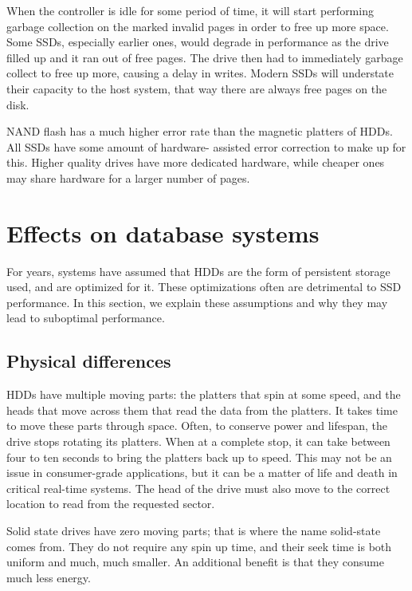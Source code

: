 \documentclass[format=acmsmall, review=false, screen=true]{acmart}
\begin{document}
When the controller is idle for some period of time, it will start performing garbage collection on the marked invalid 
pages in order to free up more space. Some SSDs, especially earlier ones, would degrade in performance as the drive filled 
up and it ran out of free pages. The drive then had to immediately garbage collect to free up more, causing a delay in writes. 
Modern SSDs will understate their capacity to the host system, that way there are always free pages on the disk. 
\cite{Dirik2009, Cornwell2012, Micheloni2013, MatejFucek2014, Chen2016}

NAND flash has a much higher error rate than the magnetic platters of HDDs. All SSDs have some amount of hardware-
assisted error correction to make up for this. Higher quality drives have more dedicated hardware, while cheaper ones 
may share hardware for a larger number of pages. \cite{Dirik2009, Cornwell2012, Micheloni2013, MatejFucek2014, Chen2016}

\section{Effects on database systems}

For years, systems have assumed that HDDs are the form of persistent storage used, and are optimized for it. These 
optimizations often are detrimental to SSD performance. In this section, we explain these assumptions and why they 
may lead to suboptimal performance.

\subsection{Physical differences}

HDDs have multiple moving parts: the platters that spin at some speed, and the heads that move across them that read the 
data from the platters. It takes time to move these parts through space. Often, to conserve power and lifespan, the drive 
stops rotating its platters. When at a complete stop, it can take between four to ten seconds to bring the platters back 
up to speed. This may not be an issue in consumer-grade applications, but it can be a matter of life and death in critical
real-time systems. \cite{MatejFucek2014} The head of the drive must also move to the correct location to read from the 
requested sector. \cite{Cornwell2012}

Solid state drives have zero moving parts; that is where the name solid-state comes from. They do not require any spin up 
time, and their seek time is both uniform and much, much smaller. An additional benefit is that they consume much less 
energy. \cite{Cornwell2012, Micheloni2013, MatejFucek2014}
\end{document}
